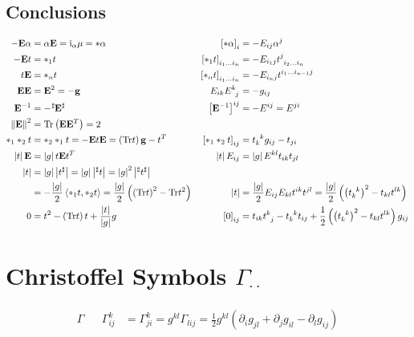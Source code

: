 \documentclass[a4paper,10pt]{scrartcl}
\newcommand{\iup}{\mathrm{i}}
\newcommand{\Tr}{\mathrm{Tr}}
\newcommand{\gb}{\mathbf{g}}
\newcommand{\Eb}{\mathbf{E}}
\begin{document}
\subsection{Conclusions}
  \begin{align*}
    -\Eb\alpha &= \alpha\Eb = \iup_{\alpha}\mu = *\alpha
            &\left[ *\alpha \right]_{i} &= -E_{ij}\alpha^{j}\\
     -\Eb t &= *_{1}t 
            &\left[ *_{1}t \right]_{i_{1}\ldots i_{n}} &= -E_{i_{1}j}\tensor{t}{^{j}_{i_{2}\ldots i_{n}}} \\
      t\Eb &= *_{n}t
            &\left[ *_{n}t \right]_{i_{1}\ldots i_{n}} &= -E_{i_{n}j}\tensor{t}{^{i_{1}\ldots i_{n-1}}^{j}} \\
      \Eb\Eb &= \Eb^{2} = -\gb
            &E_{ik}\tensor{E}{^{k}_{j}} &= -g_{ij} \\
      \Eb^{-1} &= -\tensor[^{\sharp}]{\Eb}{^{\sharp}}
            &\left[ \Eb^{-1} \right]^{ij} &= -E^{ij} = E^{ji}\\
      \left\| \Eb \right\|^{2} &= \Tr\left( \Eb\Eb^{T} \right) = 2 \\
      *_{1}*_{2}t &= *_{2}*_{1}t = -\Eb t \Eb = \left( \Tr t \right)\gb - t^{T}
                &\left[ *_{1}*_{2}t \right]_{ij} &= \tensor{t}{_{k}^{k}}g_{ij} - t_{ji} \\
      \left| t \right|\Eb &= \left| g \right|t\Eb t^{T}
                &\left| t \right|E_{ij} &= \left| g \right|E^{kl}t_{ik}t_{jl} \\
      \left| t \right| &=\left| g \right|\left| t^{\sharp} \right| = \left| g \right|\left| ^{\sharp}t \right| = \left| g \right|^{2}\left| ^{\sharp}t^{\sharp} \right|\\
        &= -\frac{\left| g \right|}{2}\left\langle *_{1}t , *_{2}t \right\rangle = \frac{\left| g \right|}{2}\left( \left( \Tr t \right)^{2} - \Tr t^{2} \right)
                &\left| t \right| &= \frac{\left| g \right|}{2} E_{ij}E_{kl}t^{ik}t^{jl} = \frac{\left| g \right|}{2}\left( \left( \tensor{t}{_{k}^{k}} \right)^{2} - t_{kl}t^{lk} \right)\\
      0 &= t^{2} - \left( \Tr t \right) t + \frac{\left| t \right|}{\left| g \right|} g
            &\left[ 0 \right]_{ij} &= t_{ik}\tensor{t}{^{k}_{j}} -  \tensor{t}{_{k}^{k}}t_{ij} + \frac{1}{2}\left( \left( \tensor{t}{_{k}^{k}} \right)^{2} - t_{kl}t^{lk} \right)g_{ij}
  \end{align*}

\section{Christoffel Symbols \( \Gamma^{\cdot}_{\cdot\cdot} \)}
\begin{align*}
  \Gamma &&\Gamma^{k}_{ij} &= \Gamma^{k}_{ji} = g^{kl}\Gamma_{lij} = \frac{1}{2}g^{kl}\left( \partial_{i}g_{jl} + \partial_{j}g_{il} - \partial_{l}g_{ij} \right) \\
\end{align*}
\end{document}
